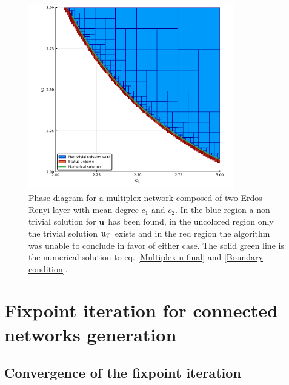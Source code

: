 \documentclass[
11pt, %
english, %
singlespacing, %
nolistspacing, %
liststotoc, %
headsepline, %
]{MastersDoctoralThesis} %
\begin{document}


\begin{figure}
	\includegraphics[width=0.8\textwidth]{two_layers_erdos_renyi_boundary.pdf}
	\caption{Phase diagram for a multiplex network composed of two Erdos-Renyi layer with mean degree $c_1$ and $c_2$. In the blue region a non trivial solution for $\boldsymbol{\mathrm{u}}$ has been found, in the uncolored region only the trivial solution $\boldsymbol{\mathrm{u}}_T$ exists and in the red region the algorithm was unable to conclude in favor of either case. The solid green line is the numerical solution to eq. \eqref{Multiplex u final} and \eqref{Boundary condition}.}
	\label{Figure: Regions and boundary}
\end{figure}


\appendix  %

\chapter{Fixpoint iteration for connected networks generation}
\section{Convergence of the fixpoint iteration}
\label{Appendix: Fixpoint convergence}
\end{document}
